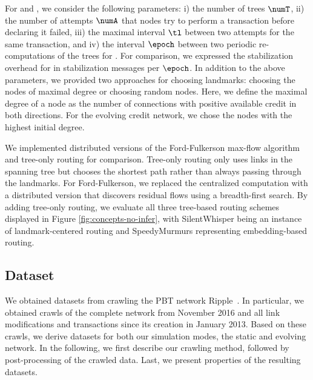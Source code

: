 For \oursys and \cnsysname , we consider the following parameters: i) the number of trees $\numT$, ii) the number of attempts $\numA$ that nodes try to perform a transaction before declaring it failed, iii) the maximal interval $\tl$ between two attempts for the same transaction, and iv) the interval $\epoch$
between two periodic re-computations of the trees for \cnsysname .
For comparison, we expressed the stabilization overhead for \oursys in stabilization messages per $\epoch$.
In addition to the above parameters, we provided two approaches for choosing landmarks: choosing the nodes of maximal degree or choosing random nodes.
Here, we define the maximal degree of a node as the number of connections with positive available credit in both directions. For the evolving credit network, we chose the nodes with the highest initial degree.

We implemented distributed versions of the
Ford-Fulkerson max-flow algorithm~\cite{ford1956maximal} and tree-only routing for comparison. Tree-only routing only uses links in the spanning tree but chooses the shortest path rather than always passing through the landmarks.  
For Ford-Fulkerson, we replaced the centralized computation with a distributed version that discovers residual flows using a breadth-first search. 
By adding tree-only routing, we evaluate all three tree-based routing schemes displayed in Figure \ref{fig:concepts-no-infer}, with SilentWhisper being an instance of landmark-centered routing and SpeedyMurmurs representing embedding-based routing.  
 

  

\subsection{Dataset}
\label{sec:dataset}

We obtained datasets from crawling the PBT network Ripple~\cite{armknecht2015ripple}. In particular, we obtained crawls of the complete network from November 2016 and all link modifications and transactions since its creation in January 2013.
Based on these crawls, we derive datasets for both our simulation modes, the static and evolving network.
In the following, we first describe our crawling method, followed by post-processing of the crawled data. Last, we present properties of the resulting datasets. 

